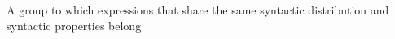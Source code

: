 A group to which expressions that share the same syntactic distribution and syntactic properties belong
